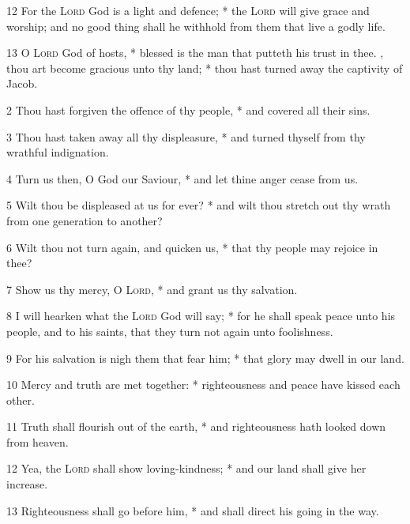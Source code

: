 12 For the {\textsc{Lord}} God is a light and defence; * the {\textsc{Lord}} will give grace and worship; and no good thing shall he withhold from them that live a godly life.\par
13 O {\textsc{Lord}} God of hosts, * blessed is the man that putteth his trust in thee.
, thou art become gracious unto thy land; * thou hast turned away the captivity of Jacob.\par
2 Thou hast forgiven the offence of thy people, * and covered all their sins.\par
3 Thou hast taken away all thy displeasure, * and turned thyself from thy wrathful indignation.\par
4 Turn us then, O God our Saviour, * and let thine anger cease from us.\par
5 Wilt thou be displeased at us for ever? * and wilt thou stretch out thy wrath from one generation to another?\par
6 Wilt thou not turn again, and quicken us, * that thy people may rejoice in thee?\par
7 Show us thy mercy, O {\textsc{Lord}}, * and grant us thy salvation.\par
8 I will hearken what the {\textsc{Lord}} God will say; * for he shall speak peace unto his people, and to his saints, that they turn not again unto foolishness.\par
9 For his salvation is nigh them that fear him; * that glory may dwell in our land.\par
10 Mercy and truth are met together: * righteousness and peace have kissed each other.\par
11 Truth shall flourish out of the earth, * and righteousness hath looked down from heaven.\par
12 Yea, the {\textsc{Lord}} shall show loving-kindness; * and our land shall give her increase.\par
13 Righteousness shall go before him, * and shall direct his going in the way.
